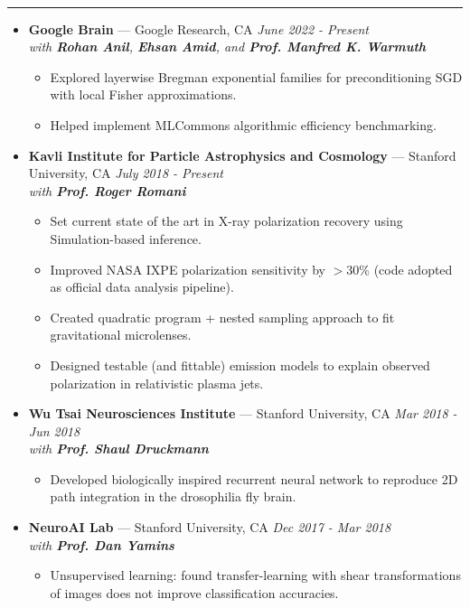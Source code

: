 \documentclass[11 pt,oneside]{article}
\newenvironment{ressection}[1]{
	\vspace{4pt}
	{\selectfont\Large\color{Mycolor2}{\textbf{#1}}}
	\vspace{-6.5pt} \\
	\textcolor{Mycolor2}{\rule{\textwidth}{0.7pt}}
	\begin{itemize}
	\vspace{3pt}
}{
	\end{itemize}
}
\newcommand{\ressubitem}{
	\vspace{-4pt}
	\item
}
\newcommand{\resbigitem}[3]{
	\vspace{-5pt}
	\item[]
	\textbf{#1} --- #2 %
	\hfill
	\textit{#3}
}
\newenvironment{ressubsec}[3]{
	\resbigitem{#1}{#2}{#3}
	\vspace{-2pt}
	\begin{itemize}
}{
	\end{itemize}
}
\begin{document}
\begin{ressection}{\textbf{Research}}

\vspace{2pt}
\begin{ressubsec}{Google Brain}{Google Research, CA}{June 2022 - Present \\ with \textbf{Rohan Anil}, \textbf{Ehsan Amid}, and \textbf{Prof. Manfred K. Warmuth}}
	\ressubitem{Explored layerwise Bregman exponential families for preconditioning SGD with local Fisher approximations.}
	\ressubitem{Helped implement MLCommons algorithmic efficiency benchmarking.}
\end{ressubsec}

	\vspace{2pt}
	\begin{ressubsec}{Kavli Institute for Particle Astrophysics and Cosmology}{Stanford University, CA}{July 2018 - Present \\ with \textbf{Prof. Roger Romani}}
\ressubitem{Set current state of the art in X-ray polarization recovery using Simulation-based inference.}
\ressubitem{Improved NASA IXPE polarization sensitivity by $>30\%$ (code adopted as official data analysis pipeline).}
\ressubitem{Created quadratic program + nested sampling approach to fit gravitational microlenses.}
		\ressubitem{Designed testable (and fittable) emission models to explain observed polarization in relativistic plasma jets.}
	\end{ressubsec}

	\vspace{2pt}
	\begin{ressubsec}{Wu Tsai Neurosciences Institute}{Stanford University, CA}{Mar 2018 - Jun 2018 \\ with \textbf{Prof. Shaul Druckmann}}
\ressubitem{Developed biologically inspired recurrent neural network to reproduce 2D path integration in the drosophilia fly brain.}
	\end{ressubsec}

	\vspace{2pt}
	\begin{ressubsec}{NeuroAI Lab}{Stanford University, CA}{Dec 2017 - Mar 2018 \\ with \textbf{Prof. Dan Yamins}}
	\ressubitem{Unsupervised learning: found transfer-learning with shear transformations of images does not improve classification accuracies.}
	\end{ressubsec}


\end{ressection}
\end{document}
